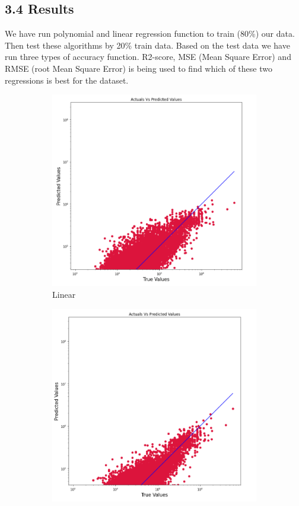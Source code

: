 \documentclass[conference]{IEEEtran}[10]
\begin{document}
\subsection{3.4 Results}
We have run polynomial and linear regression function to train (80\%) our data. Then test these algorithms by 20\% train data. Based on the test data we have run three types of accuracy function. R2-score, MSE (Mean Square Error) and RMSE (root Mean Square Error) is being used to find which of these two regressions is best for the dataset.

\begin{figure}
     \centering
     \begin{subfigure}[b]{0.2\textwidth}
         \centering
         \includegraphics[width=\textwidth]{linear}
         \caption{Linear}
         \label{fig:Linear}
     \end{subfigure}
     \qquad
     \begin{subfigure}[b]{0.2\textwidth}
         \centering
         \includegraphics[width=\textwidth]{poly}

\end{subfigure}
\end{figure}
\end{document}
